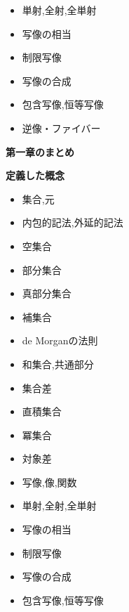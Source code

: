 \documentclass[dvipdfmx,b4j]{jsarticle}
\begin{document}
\begin{itemize}
  \item 単射,全射,全単射
  \item 写像の相当
  \item 制限写像
  \item 写像の合成
  \item 包含写像,恒等写像
  \item 逆像・ファイバー
\end{itemize}
\clearpage
\centerline{\huge{\textbf{第一章のまとめ}}}
\begin{shaded}
\noindent\textbf{定義した概念}
\begin{multicols}{2}
\begin{itemize}
  \item 集合,元
  \item 内包的記法,外延的記法
  \item 空集合 
  \item 部分集合
  \item 真部分集合
  \item 補集合
  \item de Morganの法則
  \item 和集合,共通部分
  \item 集合差
  \item 直積集合
  \item 冪集合
  \item 対象差
  \item 写像,像,関数
  \item 単射,全射,全単射
  \item 写像の相当
  \item 制限写像
  \item 写像の合成
  \item 包含写像,恒等写像
\end{itemize}
\end{multicols}
\end{shaded}
\clearpage


\clearpage
\section{}
\clearpage
\end{document}
